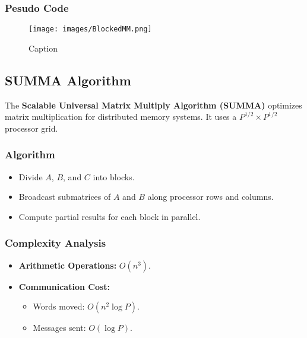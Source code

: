 \documentclass[12pt,a4paper]{article}
\begin{document}
\subsubsection{Pesudo Code}
\begin{figure}[h!]
    \centering
    \texttt{[image: images/BlockedMM.png]}
    \caption{Caption}
    \label{fig:enter-label}
\end{figure}

\subsection{SUMMA Algorithm}
The \textbf{Scalable Universal Matrix Multiply Algorithm (SUMMA)} optimizes matrix multiplication for distributed memory systems. It uses a $P^{1/2} \times P^{1/2}$ processor grid.

\subsubsection{Algorithm}
\begin{itemize}
    \item Divide $A$, $B$, and $C$ into blocks.
    \item Broadcast submatrices of $A$ and $B$ along processor rows and columns.
    \item Compute partial results for each block in parallel.
\end{itemize}

\subsubsection{Complexity Analysis}
\begin{itemize}
    \item \textbf{Arithmetic Operations:} $O(n^3)$.
    \item \textbf{Communication Cost:} 
    \begin{itemize}
        \item Words moved: $O(n^2 \log P)$.
        \item Messages sent: $O(\log P)$.
    \end{itemize}
\end{itemize}
\end{document}
